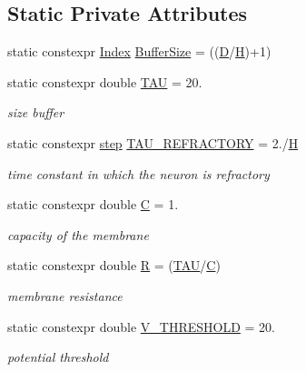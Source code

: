 \subsection*{Static Private Attributes}
\begin{DoxyCompactItemize}
\item 
static constexpr \hyperlink{constant_8hpp_a5d7deb06d9443e7d4a47bf078638cc91}{Index} \hyperlink{classNeuron_a9c8a61b96478817e5c9f5731d08eb451}{Buffer\-Size} = ((\hyperlink{constant_8hpp_a412464ee5e4d4e873c365d926d1970bb}{D}/\hyperlink{constant_8hpp_a789b632d1929c39c01c4846b8ed283cb}{H})+1)
\item 
static constexpr double \hyperlink{classNeuron_a89127210a603e20aba05463c85df38e8}{T\-A\-U} = 20.
\begin{DoxyCompactList}\small\item\em size buffer \end{DoxyCompactList}\item 
static constexpr \hyperlink{constant_8hpp_a58a8d380569868e765017aef9c749646}{step} \hyperlink{classNeuron_add7aa62e8c7b46c13f6fd642c34ed515}{T\-A\-U\-\_\-\-R\-E\-F\-R\-A\-C\-T\-O\-R\-Y} = 2./\hyperlink{constant_8hpp_a789b632d1929c39c01c4846b8ed283cb}{H}
\begin{DoxyCompactList}\small\item\em time constant in which the neuron is refractory \end{DoxyCompactList}\item 
static constexpr double \hyperlink{classNeuron_a2daa8cbf7e36fda4de6b4fde70d86418}{C} = 1.
\begin{DoxyCompactList}\small\item\em capacity of the membrane \end{DoxyCompactList}\item 
static constexpr double \hyperlink{classNeuron_ac17d81bf956c9baee8e73fa3b45ec30f}{R} = (\hyperlink{classNeuron_a89127210a603e20aba05463c85df38e8}{T\-A\-U}/\hyperlink{classNeuron_a2daa8cbf7e36fda4de6b4fde70d86418}{C})
\begin{DoxyCompactList}\small\item\em membrane resistance \end{DoxyCompactList}\item 
static constexpr double \hyperlink{classNeuron_afe5838f934fbc7e8ba549986e0a6ef90}{V\-\_\-\-T\-H\-R\-E\-S\-H\-O\-L\-D} = 20.
\begin{DoxyCompactList}\small\item\em potential threshold \end{DoxyCompactList}\item 

\end{DoxyCompactItemize}

